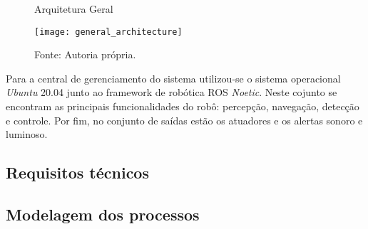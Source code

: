  \begin{figure} [h!]	
    \centering

    \caption{Arquitetura Geral}
    \texttt{[image: general\_architecture]}
    \caption*{Fonte: Autoria própria.}
    \label{fig:Arquitetura geral}
\end{figure}	

Para a central de gerenciamento do sistema utilizou-se o sistema operacional \textit{Ubuntu} 20.04 junto ao framework de robótica ROS \textit{Noetic}. Neste cojunto se encontram as principais funcionalidades do robô: percepção, navegação, detecção e controle. Por fim, no conjunto de saídas estão os atuadores e os alertas sonoro e luminoso.

\subsection{Requisitos técnicos}




\subsection{Modelagem dos processos}
